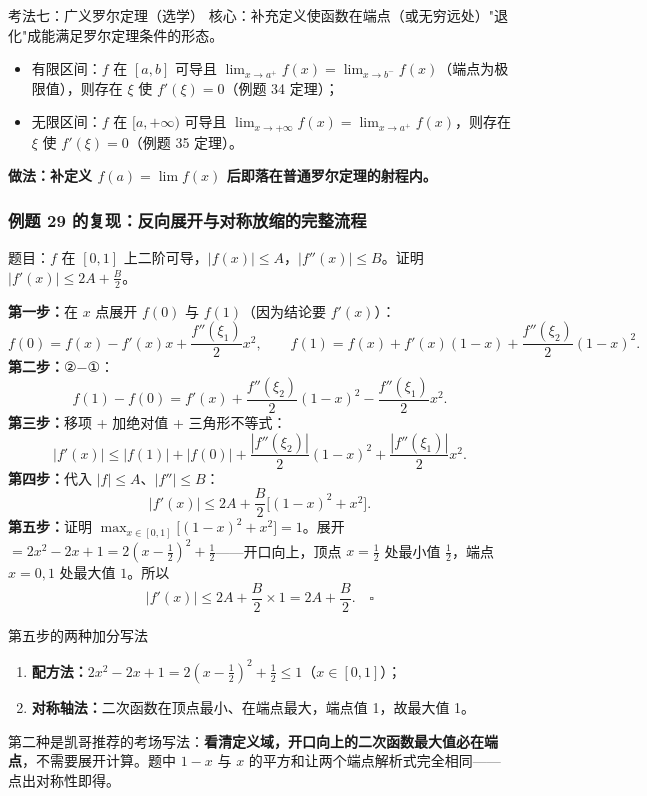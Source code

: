 \documentclass[a4paper]{article}
\begin{document}
\begin{knowledgebox}{考法七：广义罗尔定理（选学）}
核心：补充定义使函数在端点（或无穷远处）"退化"成能满足罗尔定理条件的形态。
\begin{itemize}
\item 有限区间：$f$ 在 $[a,b]$ 可导且 $\lim_{x\to a^+}f(x)=\lim_{x\to b^-}f(x)$（端点为极限值），则存在 $\xi$ 使 $f'(\xi)=0$（例题 34 定理）；
\item 无限区间：$f$ 在 $[a,+\infty)$ 可导且 $\lim_{x\to+\infty}f(x)=\lim_{x\to a^+}f(x)$，则存在 $\xi$ 使 $f'(\xi)=0$（例题 35 定理）。
\end{itemize}
\textbf{做法：补定义 $f(a)=\lim f(x)$ 后即落在普通罗尔定理的射程内。}
\end{knowledgebox}

\subsubsection{例题 29 的复现：反向展开与对称放缩的完整流程}

题目：$f$ 在 $[0,1]$ 上二阶可导，$|f(x)|\le A$，$|f''(x)|\le B$。证明 $|f'(x)|\le 2A+\frac B2$。

\textbf{第一步：}在 $x$ 点展开 $f(0)$ 与 $f(1)$（因为结论要 $f'(x)$）：
\[
f(0)=f(x)-f'(x)x+\frac{f''(\xi_1)}{2}x^2,\qquad
f(1)=f(x)+f'(x)(1-x)+\frac{f''(\xi_2)}{2}(1-x)^2.
\]
\textbf{第二步：}②$-$①：
\[
f(1)-f(0)=f'(x)+\frac{f''(\xi_2)}2(1-x)^2-\frac{f''(\xi_1)}2x^2 .
\]
\textbf{第三步：}移项 + 加绝对值 + 三角形不等式：
\[
|f'(x)|\le|f(1)|+|f(0)|+\frac{|f''(\xi_2)|}{2}(1-x)^2+\frac{|f''(\xi_1)|}2x^2 .
\]
\textbf{第四步：}代入 $|f|\le A$、$|f''|\le B$：
\[
|f'(x)|\le 2A+\frac B2\big[(1-x)^2+x^2\big].
\]
\textbf{第五步：}证明 $\displaystyle\max_{x\in[0,1]}\big[(1-x)^2+x^2\big]=1$。展开 $=2x^2-2x+1=2(x-\frac12)^2+\frac12$——开口向上，顶点 $x=\frac12$ 处最小值 $\frac12$，端点 $x=0,1$ 处最大值 $1$。所以
\[
|f'(x)|\le2A+\frac B2\times1=2A+\frac B2.\quad\square
\]

\begin{warningbox}{第五步的两种加分写法}
\begin{enumerate}
\item \textbf{配方法：}$2x^2-2x+1=2(x-\frac12)^2+\frac12\le1$（$x\in[0,1]$）；
\item \textbf{对称轴法：}二次函数在顶点最小、在端点最大，端点值 1，故最大值 1。
\end{enumerate}
第二种是凯哥推荐的考场写法：\textbf{看清定义域，开口向上的二次函数最大值必在端点}，不需要展开计算。题中 $1-x$ 与 $x$ 的平方和让两个端点解析式完全相同——点出对称性即得。
\end{warningbox}
\end{document}
